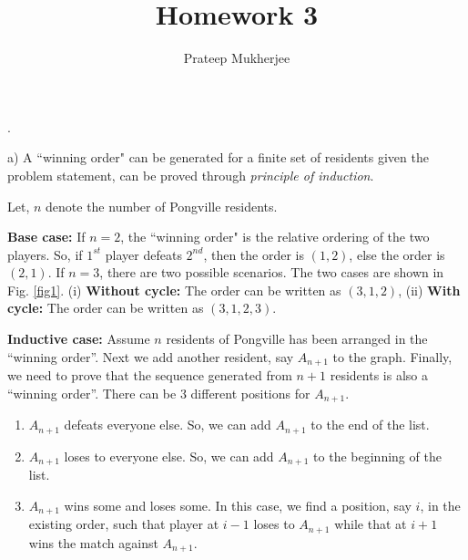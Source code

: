 \documentclass[assign]{article}
\title{Homework 3}
\author{Prateep Mukherjee}
\begin{document}
\maketitle

. 
\par \noindent a)  A ``winning order" can be generated for a finite set of residents given the problem statement, can be proved through {\em principle of induction}. 

Let, $n$ denote the number of Pongville residents.

\textbf{Base case:} If $n=2$, the ``winning order" is the relative ordering of the two players. So, if $1^{st}$ player defeats $2^{nd}$, then the order is $(1 , 2)$, else
the order is $(2,1)$.  If $n = 3$, there are two possible scenarios. The two cases are shown in Fig. \ref{fig1}. (i) \textbf{Without cycle:} The order can be written as $(3 ,1 ,2)$, (ii) \textbf{With cycle:} The order can be written as $(3,1,2,3)$.


\par\textbf{Inductive case:} Assume $n$ residents of Pongville has been arranged in the ``winning order''. Next we add another resident, say $A_{n+1}$ to the graph. Finally, we need to prove that the sequence generated from $n+1$ residents is also a ``winning order''.  There can be 3 different positions for $A_{n+1}$.

\begin{enumerate}[i]
  \addtolength{\itemsep}{-8pt}
  \item $A_{n+1}$ defeats everyone else. So, we can add $A_{n+1}$ to the end of the list. 
  \item $A_{n+1}$ loses to everyone else. So, we can add $A_{n+1}$ to the beginning of the list.
  \item $A_{n+1}$ wins some and loses some. In this case, we find a position, say $i$, in the existing order, such that player at $i-1$ loses to $A_{n+1}$ while that at $i+1$ wins the match against $A_{n+1}$. 
\end{enumerate}
\end{document}
